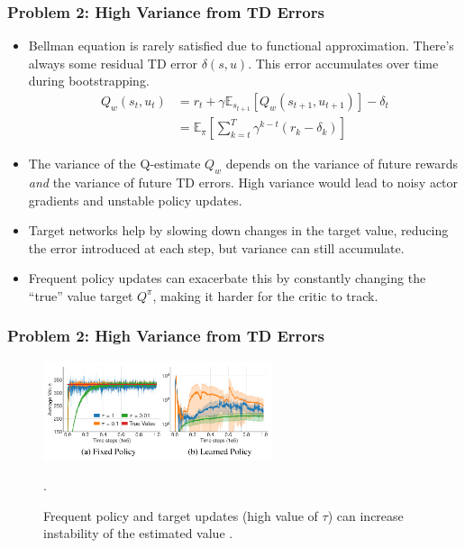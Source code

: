 \documentclass[9pt, aspectratio=169]{beamer}
\begin{document}
\begin{frame}
  \frametitle{Problem 2: High Variance from TD Errors}
    \begin{itemize}
        \item Bellman equation is rarely satisfied due to functional approximation. There's always some residual TD error $\delta(s, u)$. This error accumulates over time during bootstrapping.
        \begin{align*}
         Q_w(s_t, u_t) &= r_t + \gamma \mathbb{E}_{s_{t+1}} [Q_w(s_{t+1}, u_{t+1})] - \delta_t \\
         &= \mathbb{E}_\pi \left[ \sum_{k=t}^T \gamma^{k-t} (r_k - \delta_k) \right]
        \end{align*}
        \item The variance of the Q-estimate $Q_w$ depends on the variance of future rewards \textit{and} the variance of future TD errors. High variance would lead to noisy actor gradients and unstable policy updates.
        \item Target networks help by slowing down changes in the target value, reducing the error introduced at each step, but variance can still accumulate.
        \item Frequent policy updates can exacerbate this by constantly changing the ``true'' value target $Q^\pi$, making it harder for the critic to track.
    \end{itemize}
\end{frame}

\begin{frame}
  \frametitle{Problem 2: High Variance from TD Errors}
     \begin{figure}
        \centering
        \includegraphics[width=0.6\textwidth]{ddpg-variance.png}
        \caption{Frequent policy and target updates (high value of $\tau$) can increase instability of the estimated value \cite{fujimoto2018addressingfunctionapproximationerror}.}.
    \end{figure}
\end{frame}

\end{document}
